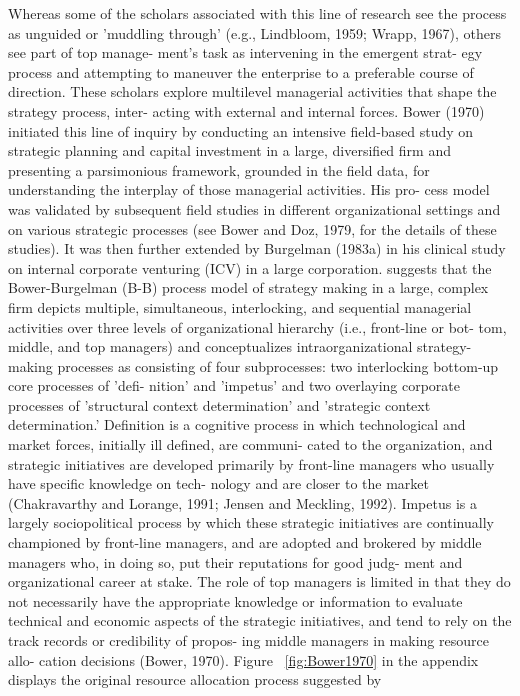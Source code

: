 \documentclass[12pt,letterpaper]{article}
\begin{document}
\cite{Noda1996} Whereas some of the scholars associated with this line of research see the process as unguided or 'muddling through' (e.g., Lindbloom, 1959; Wrapp, 1967), others see part of top manage- ment's task as intervening in the emergent strat- egy process and attempting to maneuver the enterprise to a preferable course of direction. These scholars explore multilevel managerial activities that shape the strategy process, inter- acting with external and internal forces. Bower (1970) initiated this line of inquiry by conducting an intensive field-based study on strategic planning and capital investment in a large, diversified firm and presenting a parsimonious framework, grounded in the field data, for understanding the interplay of those managerial activities. His pro- cess model was validated by subsequent field studies in different organizational settings and on various strategic processes (see Bower and Doz, 1979, for the details of these studies). It was then further extended by Burgelman (1983a) in his clinical study on internal corporate venturing (ICV) in a large corporation. \cite{Noda1996} suggests that the Bower-Burgelman (B-B) process model of strategy making in a large, complex firm depicts multiple, simultaneous, interlocking, and sequential managerial activities over three levels of organizational hierarchy (i.e., front-line or bot- tom, middle, and top managers) and conceptualizes intraorganizational strategy-making processes as consisting of four subprocesses: two interlocking bottom-up core processes of 'defi- nition' and 'impetus' and two overlaying corporate processes of 'structural context determination' and 'strategic context determination.' Definition is a cognitive process in which technological and market forces, initially ill defined, are communi- cated to the organization, and strategic initiatives are developed primarily by front-line managers who usually have specific knowledge on tech- nology and are closer to the market (Chakravarthy and Lorange, 1991; Jensen and Meckling, 1992). Impetus is a largely sociopolitical process by which these strategic initiatives are continually championed by front-line managers, and are adopted and brokered by middle managers who, in doing so, put their reputations for good judg- ment and organizational career at stake. The role of top managers is limited in that they do not necessarily have the appropriate knowledge or information to evaluate technical and economic aspects of the strategic initiatives, and tend to rely on the track records or credibility of propos- ing middle managers in making resource allo- cation decisions (Bower, 1970).
Figure ~\ref{fig:Bower1970} in the appendix displays the original resource allocation process suggested by \cite{Bower1970}
\end{document}
